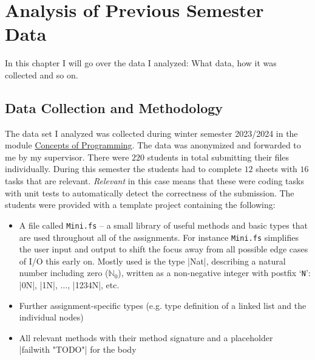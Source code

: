 \chapter{Analysis of Previous Semester Data} %



In this chapter I will go over the data I analyzed: What data, how it was collected and so on.


\section{Data Collection and Methodology} %


The data set I analyzed was collected during winter semester 2023/2024 in the module \href{https://modhb.rptu.de/mhb/modules/INF-02-01-M-2/}{Concepts of Programming}.
The data was anonymized and forwarded to me by my supervisor. There were \(220\) students in total submitting their files individually.
During this semester the students had to complete \(12\) sheets with \(16\) tasks that are relevant.
\textit{Relevant} in this case means that these were coding tasks with unit tests to automatically detect the correctness of the submission.
The students were provided with a template project containing the following:

\begin{itemize}[nosep]
    \item A file called \texttt{Mini.fs} -- a small library of useful methods and basic types that are used throughout all of the assignments.
        For instance \texttt{Mini.fs} simplifies the user input and output to shift the focus away from all possible edge cases of I/O this early on.
        Mostly used is the type \fsharp|Nat|, describing a natural number including zero (\(\mathbb{N}_0\)),
        written as a non-negative integer with postfix `\texttt{N}': \fsharp|0N|, \fsharp|1N|, \(\dotsc\), \fsharp|1234N|, etc.
    \item Further assignment-specific types (e.g. type definition of a linked list and the individual nodes)
    \item All relevant methods with their method signature and a placeholder\\
        \fsharp|failwith "TODO"| for the body
\end{itemize}

